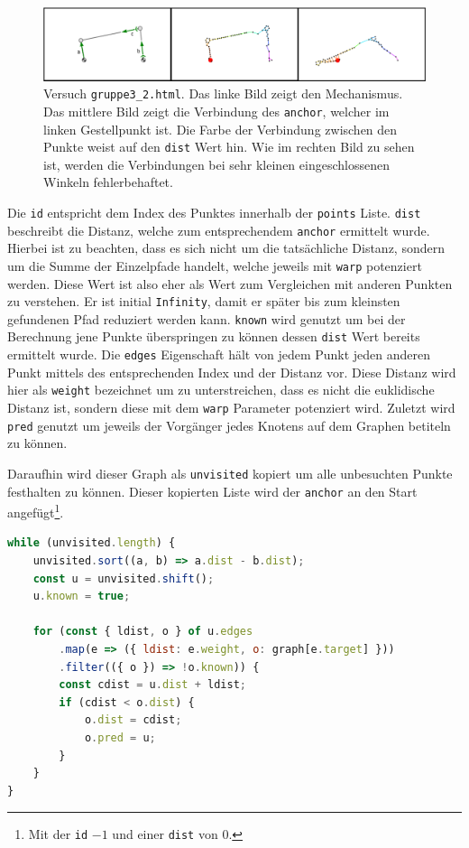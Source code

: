\begin{figure}
    \centering
    \includegraphics[width=\textwidth]{gfx/dijkstra_edit.png}
    \caption[Versuch \lstinline{gruppe3_2.html}]{Versuch \lstinline{gruppe3_2.html}. Das linke Bild zeigt den Mechanismus. Das mittlere Bild zeigt die Verbindung des \lstinline{anchor}, welcher im linken Gestellpunkt ist. Die Farbe der Verbindung zwischen den Punkte weist auf den \lstinline{dist} Wert hin.
    Wie im rechten Bild zu sehen ist, werden die Verbindungen bei sehr kleinen eingeschlossenen Winkeln fehlerbehaftet.}
    \label{fig:gruppe3_1}
\end{figure}

Die \lstinline{id} entspricht dem Index des Punktes innerhalb der \lstinline{points} Liste.
\lstinline{dist} beschreibt die Distanz, welche zum entsprechendem \lstinline{anchor} ermittelt wurde.
Hierbei ist zu beachten, dass es sich nicht um die tatsächliche Distanz, sondern um die Summe der Einzelpfade handelt, welche jeweils mit \lstinline{warp} potenziert werden.
Diese Wert ist also eher als Wert zum Vergleichen mit anderen Punkten zu verstehen.
Er ist initial \lstinline{Infinity}, damit er später bis zum kleinsten gefundenen Pfad reduziert werden kann.
\lstinline{known} wird genutzt um bei der Berechnung jene Punkte überspringen zu können dessen \lstinline{dist} Wert bereits ermittelt wurde.
Die \lstinline{edges} Eigenschaft hält von jedem Punkt jeden anderen Punkt mittels des entsprechenden Index und der Distanz vor.
Diese Distanz wird hier als \lstinline{weight} bezeichnet um zu unterstreichen, dass es nicht die euklidische Distanz ist, sondern diese mit dem \lstinline{warp} Parameter potenziert wird.
Zuletzt wird \lstinline{pred} genutzt um jeweils der Vorgänger jedes Knotens auf dem Graphen betiteln zu können.

Daraufhin wird dieser Graph als \lstinline{unvisited} kopiert um alle unbesuchten Punkte festhalten zu können.
Dieser kopierten Liste wird der \lstinline{anchor} an den Start angefügt\footnote{Mit der \lstinline{id} $-1$ und einer \lstinline{dist} von 0.}.

\begin{lstlisting}[language=JavaScript, caption={Berechnung der \lstinline{dist} Eigenschaft der einzelnen Objekte aus dem Dijkstra-Graphen.}, label={lst:creation_dijkstra_graph}]
while (unvisited.length) {
    unvisited.sort((a, b) => a.dist - b.dist);
    const u = unvisited.shift();
    u.known = true;

    for (const { ldist, o } of u.edges
        .map(e => ({ ldist: e.weight, o: graph[e.target] }))
        .filter(({ o }) => !o.known)) {
        const cdist = u.dist + ldist;
        if (cdist < o.dist) {
            o.dist = cdist;
            o.pred = u;
        }
    }
}
\end{lstlisting}

